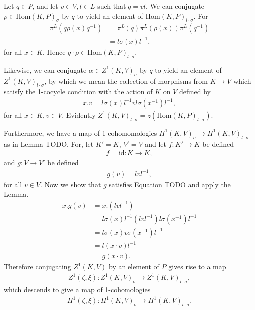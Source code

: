Let $q \in P$, and let $v \in V, l \in L$ such that $q = vl$. We can conjugate $\rho \in \mathrm{Hom}(K, P)_\sigma$ by $q$ to yield an element of $\mathrm{Hom}(K, P)_{l \cdot \sigma}$. For
\begin{align*}%
\pi^L\left(q \rho(x) q^{-1}\right)%
&= \pi^L\left(q\right) \pi^L\left(\rho(x)\right) \pi^L\left(q^{-1}\right) \\
&= l \sigma(x) l^{-1},
\end{align*}
for all $x \in K$. Hence $q \cdot \rho \in \mathrm{Hom}(K, P)_{l\cdot \sigma}$.

Likewise, we can conjugate $\alpha \in Z^1(K, V)_\sigma$ by $q$ to yield an element of $Z^1(K, V)_{l \cdot \sigma}$, by which we mean the collection of morphisms from $K \rightarrow V$ which satisfy the 1-cocycle condition with the action of $K$ on $V$ defined by
\begin{align*}
	x.v = l \sigma(x) l^{-1} v l \sigma(x^{-1}) l^{-1},
\end{align*}
for all $x \in K, v\in V$. Evidently $Z^1(K, V)_{l \cdot \sigma} = z\left(\mathrm{Hom}(K, P)_{l \cdot \sigma}\right)$.

Furthermore, we have a map of 1-cohomomologies $H^1(K, V)_\sigma \rightarrow H^1(K, V)_{l \cdot \sigma}$ as in Lemma TODO.
	For, let $K' = K$, $V' = V$ and let $f:K' \rightarrow K$ be defined
	\begin{align*}
		f = \mathrm{id}:K \rightarrow K,
	\end{align*}
	and $g: V \rightarrow V'$ be defined
	\begin{align*}
		g(v) = lvl^{-1},
	\end{align*}
	for all $v \in V$. Now we show that $g$ satisfies Equation TODO and apply the Lemma.
	\begin{align*}
		x . g(v) &= x . \left(lvl^{-1}\right) \\
		&= l\sigma(x)l^{-1} \left(lvl^{-1}\right) l\sigma(x^{-1})l^{-1} \\
		&= l\sigma(x)v\sigma(x^{-1})l^{-1} \\
		&= l\left(x \cdot v \right)l^{-1} \\
		&= g\left(x \cdot v \right).
	\end{align*}
	Therefore conjugating $Z^1(K, V)$ by an element of $P$ gives rise to a map
	\begin{align*}
		Z^1(\zeta, \xi):Z^1(K, V)_\sigma \rightarrow Z^1(K, V)_{l \cdot \sigma},
	\end{align*}
	which descends to give a map of 1-cohomologies
	\begin{align*}
		H^1(\zeta, \xi):H^1(K, V)_\sigma \rightarrow H^1(K, V)_{l \cdot \sigma}.
	\end{align*}

